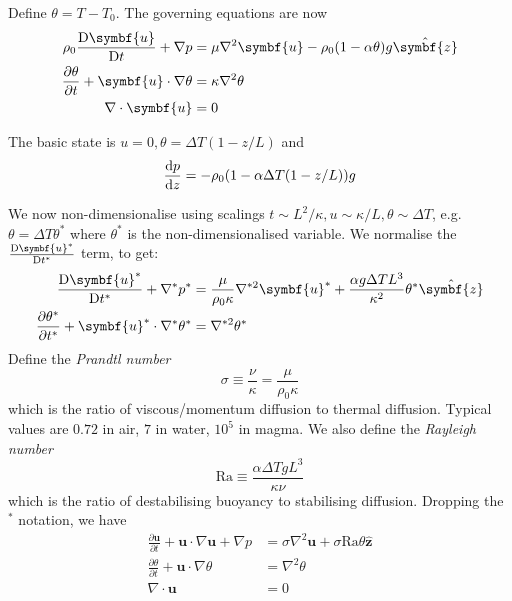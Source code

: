 \documentclass{jknotes}
\renewcommand{\u}{\symbf{u}}
\begin{document}
Define $\theta = T - T_0$. The governing equations are now
\begin{align}
	\rho_0 \frac{\diffD \u}{\diffD t} + \nabla p &= \mu \nabla^2 \u -
	\rho_0(1-\alpha \theta)g \hat{\symbf{z}} \\
	\frac{\partial \theta}{\partial t} + \u \cdot \nabla \theta &= \kappa
	\nabla^2 \theta \\
	\nabla \cdot \u &= 0
\end{align}

The basic state is $u = 0, \theta = \Delta T (1-z/L)$ and
\begin{equation}
	\frac{\diffd p}{\diffd z} = -\rho_0 (1-\alpha \Delta T(1-z/L))g
\end{equation}

We now non-dimensionalise using scalings $t \sim L^2/\kappa, u \sim \kappa/L,
\theta \sim \Delta T$, e.g. $\theta = \Delta T \theta^*$ where $\theta^*$ is
the non-dimensionalised variable. We normalise the $\frac{\diffD \u^*}{\diffD
t^*}$ term, to get:
\begin{align}
	\frac{\diffD \u^*}{\diffD t^*} + \nabla^* p^* &= \frac{\mu}{\rho_0 \kappa}
	\nabla^{*2} \u^* + \frac{\alpha g \Delta T L^3}{\kappa^2} \theta^* \hat{\symbf{z}} \\
	\frac{\partial \theta^*}{\partial t^*} + \u^* \cdot \nabla^* \theta^* &=
	\nabla^{*2} \theta^* \\
\end{align}
Define the \emph{Prandtl number} 
\begin{equation}
	\sigma \equiv \frac{\nu}{\kappa} = \frac{\mu}{\rho_0 \kappa}
\end{equation}
which is the ratio of viscous/momentum diffusion to thermal diffusion. Typical values
are $0.72$ in air, $7$ in water, $10^5$ in magma. We also define the
\emph{Rayleigh number}
\begin{equation}
	\text{Ra} \equiv \frac{\alpha \Delta T g L^3}{\kappa \nu}
\end{equation}
which is the ratio of destabilising buoyancy to stabilising diffusion.
Dropping the $^*$ notation, we have
\begin{align}
	\frac{\partial \u}{\partial t} + \u \cdot \nabla \u + \nabla p &= \sigma
	\nabla^2 \u + \sigma \text{Ra} \theta \hat{\symbf{z}} \\
	\frac{\partial \theta}{\partial t} + \u \cdot \nabla \theta &= \nabla^2
	\theta \\
	\nabla \cdot \u &= 0
\end{align}
\end{document}
